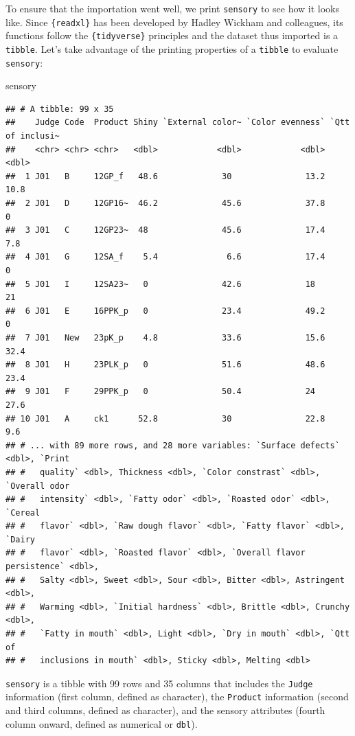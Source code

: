 \documentclass[
]{book}
\newenvironment{Shaded}{\begin{snugshade}}{\end{snugshade}}
\newcommand{\NormalTok}[1]{#1}
\begin{document}
To ensure that the importation went well, we print \texttt{sensory} to see how it looks like. Since \texttt{\{readxl\}} has been developed by Hadley Wickham and colleagues, its functions follow the \texttt{\{tidyverse\}} principles and the dataset thus imported is a \texttt{tibble}. Let's take advantage of the printing properties of a \texttt{tibble} to evaluate \texttt{sensory}:

\begin{Shaded}
\begin{Highlighting}[]
\NormalTok{sensory}
\end{Highlighting}
\end{Shaded}

\begin{verbatim}
## # A tibble: 99 x 35
##    Judge Code  Product Shiny `External color~ `Color evenness` `Qtt of inclusi~
##    <chr> <chr> <chr>   <dbl>            <dbl>            <dbl>            <dbl>
##  1 J01   B     12GP_f   48.6             30               13.2             10.8
##  2 J01   D     12GP16~  46.2             45.6             37.8              0  
##  3 J01   C     12GP23~  48               45.6             17.4              7.8
##  4 J01   G     12SA_f    5.4              6.6             17.4              0  
##  5 J01   I     12SA23~   0               42.6             18               21  
##  6 J01   E     16PPK_p   0               23.4             49.2              0  
##  7 J01   New   23pK_p    4.8             33.6             15.6             32.4
##  8 J01   H     23PLK_p   0               51.6             48.6             23.4
##  9 J01   F     29PPK_p   0               50.4             24               27.6
## 10 J01   A     ck1      52.8             30               22.8              9.6
## # ... with 89 more rows, and 28 more variables: `Surface defects` <dbl>, `Print
## #   quality` <dbl>, Thickness <dbl>, `Color constrast` <dbl>, `Overall odor
## #   intensity` <dbl>, `Fatty odor` <dbl>, `Roasted odor` <dbl>, `Cereal
## #   flavor` <dbl>, `Raw dough flavor` <dbl>, `Fatty flavor` <dbl>, `Dairy
## #   flavor` <dbl>, `Roasted flavor` <dbl>, `Overall flavor persistence` <dbl>,
## #   Salty <dbl>, Sweet <dbl>, Sour <dbl>, Bitter <dbl>, Astringent <dbl>,
## #   Warming <dbl>, `Initial hardness` <dbl>, Brittle <dbl>, Crunchy <dbl>,
## #   `Fatty in mouth` <dbl>, Light <dbl>, `Dry in mouth` <dbl>, `Qtt of
## #   inclusions in mouth` <dbl>, Sticky <dbl>, Melting <dbl>
\end{verbatim}

\texttt{sensory} is a tibble with 99 rows and 35 columns that includes the \texttt{Judge} information (first column, defined as character), the \texttt{Product} information (second and third columns, defined as character), and the sensory attributes (fourth column onward, defined as numerical or \texttt{dbl}).
\end{document}
